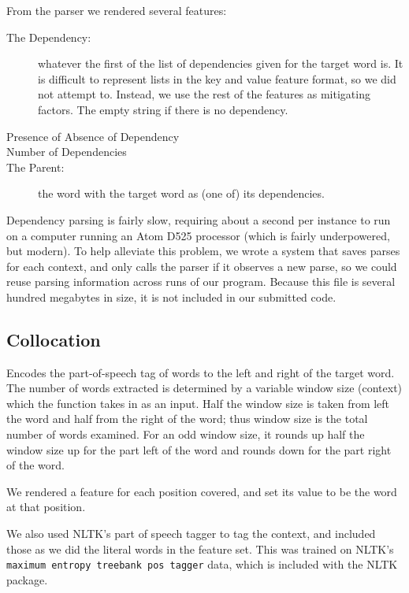 \documentclass{article}
\begin{document}
From the parser we rendered several features:

\begin{description}

\item[The Dependency:] whatever the first of the list of dependencies given for
the target word is.  It is difficult to represent lists in the key and value
feature format, so we did not attempt to.  Instead, we use the rest of the
features as mitigating factors.  The empty string if there is no dependency.

\item[Presence of Absence of Dependency]

\item[Number of Dependencies]

\item[The Parent:] the word with the target word as (one of) its dependencies.

\end{description}

Dependency parsing is fairly slow, requiring about a second per instance to run
on a computer running an Atom D525 processor (which is fairly underpowered, but
modern).  To help alleviate this problem, we wrote a system that saves parses
for each context, and only calls the parser if it observes a new parse, so we
could reuse parsing information across runs of our program.  Because this file
is several hundred megabytes in size, it is not included in our submitted code.
\subsection{Collocation}

Encodes the part-of-speech tag of words to the left and right of the target
word. The number of words extracted is determined by a variable window size
(context) which the function takes in as an input. Half the window size is
taken from left the word and half from the right of the word; thus window size
is the total number of words examined. For an odd window size, it rounds up
half the window size up for the part left of the word and rounds down for the
part right of the word.

We rendered a feature for each position covered, and set its value to be the
word at that position.

We also used NLTK's part of speech tagger to tag the context, and included those
as we did the literal words in the feature set.  This was trained on NLTK's
\verb+maximum entropy treebank pos tagger+ data, which is included with the NLTK
package.
\end{document}

